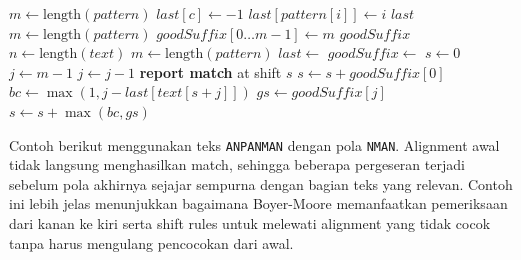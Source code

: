 \begin{tcolorbox}[breakable,title={Pseudocode Algoritma Boyer-Moore}]
    \begin{algorithmic}[1]
        \State $m \gets \text{length}(pattern)$
        \State $last[c] \gets -1$
        \EndFor
        \State $last[pattern[i]] \gets i$
        \EndFor
        \State \Return $last$
        \EndProcedure
        \Statex
        \State $m \gets \text{length}(pattern)$
        \State $goodSuffix[0 \dots m-1] \gets m$
        \State \Return $goodSuffix$
        \EndProcedure
        \Statex
        \State $n \gets \text{length}(text)$
        \State $m \gets \text{length}(pattern)$
        \State $last \gets$ 
        \State $goodSuffix \gets$ 
        \State $s \gets 0$
        \State $j \gets m - 1$
        \State $j \gets j - 1$
        \EndWhile
        \State \textbf{report match} at shift $s$
        \State $s \gets s + goodSuffix[0]$
        \Else
        \State $bc \gets \max(1, j - last[text[s + j]])$
        \State $gs \gets goodSuffix[j]$
        \State $s \gets s + \max(bc, gs)$
        \EndIf
        \EndWhile
        \EndProcedure
    \end{algorithmic}
\end{tcolorbox}

Contoh berikut menggunakan teks \texttt{ANPANMAN} dengan pola \texttt{NMAN}. Alignment awal tidak langsung menghasilkan match, sehingga beberapa pergeseran terjadi sebelum pola akhirnya sejajar sempurna dengan bagian teks yang relevan. Contoh ini lebih jelas menunjukkan bagaimana Boyer-Moore memanfaatkan pemeriksaan dari kanan ke kiri serta shift rules untuk melewati alignment yang tidak cocok tanpa harus mengulang pencocokan dari awal.

